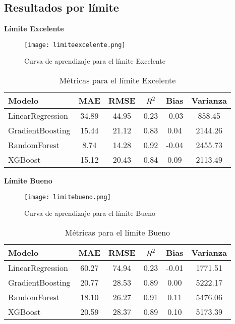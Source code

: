 \documentclass[12pt]{article}
\begin{document}
\subsection*{Resultados por límite}
\textbf{Límite Excelente}
\begin{figure}[h!]
    \centering
    \texttt{[image: limiteexcelente.png]}
    \caption{Curva de aprendizaje para el límite Excelente}
\end{figure}
\begin{table}[h!]
    \centering
    \begin{tabular}{lccccc}
        \toprule
        Modelo & MAE & RMSE & $R^2$ & Bias & Varianza \\
        \midrule
        LinearRegression & 34.89 & 44.95 & 0.23 & -0.03 & 858.45 \\
        GradientBoosting & 15.44 & 21.12 & 0.83 & 0.04 & 2144.26 \\
        RandomForest & 8.74 & 14.28 & 0.92 & -0.04 & 2455.73 \\
        XGBoost & 15.12 & 20.43 & 0.84 & 0.09 & 2113.49 \\
        \bottomrule
    \end{tabular}
    \caption{Métricas para el límite Excelente}
\end{table}

\textbf{Límite Bueno}
\begin{figure}[h!]
    \centering
    \texttt{[image: limitebueno.png]}
    \caption{Curva de aprendizaje para el límite Bueno}
\end{figure}
\begin{table}[h!]
    \centering
    \begin{tabular}{lccccc}
        \toprule
        Modelo & MAE & RMSE & $R^2$ & Bias & Varianza \\
        \midrule
        LinearRegression & 60.27 & 74.94 & 0.23 & -0.01 & 1771.51 \\
        GradientBoosting & 20.77 & 28.53 & 0.89 & 0.00 & 5222.17 \\
        RandomForest & 18.10 & 26.27 & 0.91 & 0.11 & 5476.06 \\
        XGBoost & 20.59 & 28.37 & 0.89 & 0.10 & 5173.39 \\
        \bottomrule
    \end{tabular}
    \caption{Métricas para el límite Bueno}
\end{table}
\end{document}
